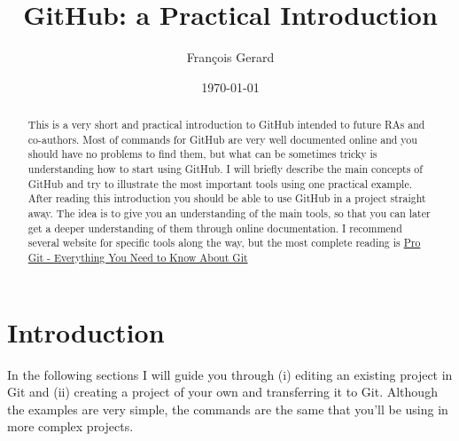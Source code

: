 \documentclass[12pt]{article}
\begin{document}
\title{GitHub: a Practical Introduction} %
\author{Fran\c{c}ois Gerard} %


\date{\today}  %

\maketitle  %



\begin{abstract} 
	This is a very short and practical introduction to GitHub intended to future RAs and co-authors. Most of commands for GitHub are very well documented online and you should have no problems to find them, but what can be sometimes tricky is understanding how to start using GitHub. I will briefly describe the main concepts of GitHub and try to illustrate the most important tools using one practical example. After reading this introduction you should be able to use GitHub in a project straight away. The idea is to give you an understanding of the main tools, so that you can later get a deeper understanding of them through online documentation. I recommend several website for specific tools along the way, but the most complete reading is \href{https://git-scm.com/book/en/v2}{Pro Git - Everything You Need to Know About Git} %
\end{abstract}

\section{Introduction}
	 
    In the following sections I will guide you through (i) editing an existing project in Git and (ii) creating a project of your own and transferring it to Git. Although the examples are very simple, the commands are the same that you'll be using in more complex projects.
    
    
\end{document}
